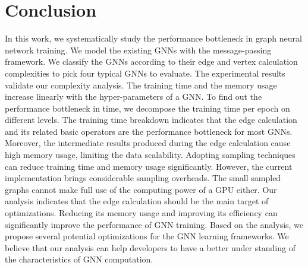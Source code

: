 \section{Conclusion}

In this work, we systematically study the performance bottleneck in graph neural network training.
We model the existing GNNs with the message-passing framework.
We classify the GNNs according to their edge and vertex calculation complexities to pick four typical GNNs to evaluate.
The experimental results validate our complexity analysis.
The training time and the memory usage increase linearly with the hyper-parameters of a GNN.
To find out the performance bottleneck in time, we decompose the training time per epoch on different levels.
The training time breakdown indicates that the edge calculation and its related basic operators are the performance bottleneck for most GNNs.
Moreover, the intermediate results produced during the edge calculation cause high memory usage, limiting the data scalability.
Adopting sampling techniques can reduce training time and memory usage significantly.
However, the current implementation brings considerable sampling overheads.
The small sampled graphs cannot make full use of the computing power of a GPU either.
Our analysis indicates that the edge calculation should be the main target of optimizations.
Reducing its memory usage and improving its efficiency can significantly improve the performance of GNN training.
Based on the analysis, we propose several potential optimizations for the GNN learning frameworks.
We believe that our analysis can help developers to have a better under standing of the characteristics of GNN computation.